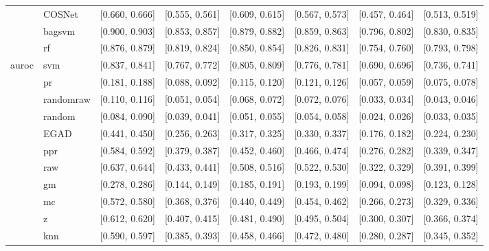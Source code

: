 \begin{table}[H]
{\begin{tabular}{llllllll}
 & COSNet & [0.660, 0.666] & [0.555, 0.561] & [0.609, 0.615] & [0.567, 0.573] & [0.457, 0.464] & [0.513, 0.519]\\

 & bagsvm & [0.900, 0.903] & [0.853, 0.857] & [0.879, 0.882] & [0.859, 0.863] & [0.796, 0.802] & [0.830, 0.835]\\

 & rf & [0.876, 0.879] & [0.819, 0.824] & [0.850, 0.854] & [0.826, 0.831] & [0.754, 0.760] & [0.793, 0.798]\\

\multirow{-15}{*}{\raggedright\arraybackslash auroc} & svm & [0.837, 0.841] & [0.767, 0.772] & [0.805, 0.809] & [0.776, 0.781] & [0.690, 0.696] & [0.736, 0.741]\\
\cmidrule{1-8}
 & pr & [0.181, 0.188] & [0.088, 0.092] & [0.115, 0.120] & [0.121, 0.126] & [0.057, 0.059] & [0.075, 0.078]\\

 & randomraw & [0.110, 0.116] & [0.051, 0.054] & [0.068, 0.072] & [0.072, 0.076] & [0.033, 0.034] & [0.043, 0.046]\\

 & random & [0.084, 0.090] & [0.039, 0.041] & [0.051, 0.055] & [0.054, 0.058] & [0.024, 0.026] & [0.033, 0.035]\\

 & EGAD & [0.441, 0.450] & [0.256, 0.263] & [0.317, 0.325] & [0.330, 0.337] & [0.176, 0.182] & [0.224, 0.230]\\

 & ppr & [0.584, 0.592] & [0.379, 0.387] & [0.452, 0.460] & [0.466, 0.474] & [0.276, 0.282] & [0.339, 0.347]\\

 & raw & [0.637, 0.644] & [0.433, 0.441] & [0.508, 0.516] & [0.522, 0.530] & [0.322, 0.329] & [0.391, 0.399]\\

 & gm & [0.278, 0.286] & [0.144, 0.149] & [0.185, 0.191] & [0.193, 0.199] & [0.094, 0.098] & [0.123, 0.128]\\

 & mc & [0.572, 0.580] & [0.368, 0.376] & [0.440, 0.449] & [0.454, 0.462] & [0.266, 0.273] & [0.329, 0.336]\\

 & z & [0.612, 0.620] & [0.407, 0.415] & [0.481, 0.490] & [0.495, 0.504] & [0.300, 0.307] & [0.366, 0.374]\\

 & knn & [0.590, 0.597] & [0.385, 0.393] & [0.458, 0.466] & [0.472, 0.480] & [0.280, 0.287] & [0.345, 0.352]\\


\end{tabular}}
\end{table}
